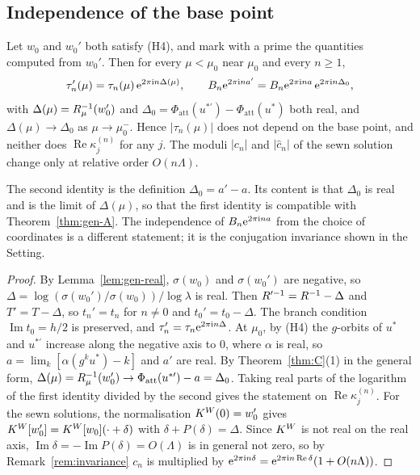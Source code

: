\subsection{Independence of the base point}

\begin{proposition}\label{prop:gen-base}
Let $w_0$ and $w_0'$ both satisfy \textup{(H4)}, and mark with a prime the
quantities computed from $w_0'$.  Then for every $\mu<\mu_0$ near $\mu_0$ and every
$n\ge1$,
\[
 \tau_n'(\mu)=\tau_n(\mu)\,\mathrm{e}^{2\pi\mathrm{i} n\Delta(\mu)},\qquad
 B_n\mathrm{e}^{2\pi\mathrm{i} na'}=B_n\mathrm{e}^{2\pi\mathrm{i} na}\,\mathrm{e}^{2\pi\mathrm{i} n\Delta_0},
\]
with $\Delta(\mu)=R_\mu^{-1}(w_0')$ and $\Delta_0=\Phi_{\mathrm{att}}(u^{*\prime})-\Phi_{\mathrm{att}}(u^*)$
both real, and $\Delta(\mu)\to\Delta_0$ as $\mu\to\mu_0^-$.  Hence $|\tau_n(\mu)|$ does not depend on the base point, and
neither does $\operatorname{Re}\kappa^{(n)}_j$ for any $j$.  The moduli $|c_n|$
and $|\hat c_n|$ of the sewn solution change only at relative order $O(n\Lambda)$.
\end{proposition}

The second identity is the definition $\Delta_0=a'-a$.  Its content is that
$\Delta_0$ is real and is the limit of $\Delta(\mu)$, so that the first identity
is compatible with Theorem~\ref{thm:gen-A}.  The independence of
$B_n\mathrm{e}^{2\pi\mathrm{i} na}$ from the choice of coordinates is a different statement;
it is the conjugation invariance shown in the Setting.

\begin{proof}
By Lemma~\ref{lem:gen-real}, $\sigma(w_0)$ and $\sigma(w_0')$ are negative, so
$\Delta=\log(\sigma(w_0')/\sigma(w_0))/\log\lambda$ is real.  Then
$R'^{-1}=R^{-1}-\Delta$ and $T'=T-\Delta$, so $t_n'=t_n$ for $n\ne0$ and
$t_0'=t_0-\Delta$.  The branch condition $\operatorname{Im}t_0=h/2$ is preserved,
and $\tau_n'=\tau_n\mathrm{e}^{2\pi\mathrm{i} n\Delta}$.  At $\mu_0$, by \textup{(H4)} the
$g$-orbits of $u^*$ and $u^{*\prime}$ increase along the negative axis to $0$,
where $\alpha$ is real, so $a=\lim_k[\alpha(g^ku^*)-k]$ and $a'$ are real.  By
Theorem~\ref{thm:C}(1) in the general form,
$\Delta(\mu)=R_\mu^{-1}(w_0')\to\Phi_{\mathrm{att}}(u^{*\prime})-a=\Delta_0$.  Taking real
parts of the logarithm of the first identity divided by the second gives the
statement on $\operatorname{Re}\kappa^{(n)}_j$.  For the sewn solutions, the
normalisation $K^W(0)=w_0'$ gives $K^W[w_0']=K^W[w_0](\cdot+\delta)$ with
$\delta+P(\delta)=\Delta$.  Since $K^W$ is not real on the real axis,
$\operatorname{Im}\delta=-\operatorname{Im}P(\delta)=O(\Lambda)$ is in general not zero,
so by Remark~\ref{rem:invariance} $c_n$ is multiplied by
$\mathrm{e}^{2\pi\mathrm{i} n\delta}=\mathrm{e}^{2\pi\mathrm{i} n\operatorname{Re}\delta}(1+O(n\Lambda))$.
\end{proof}

